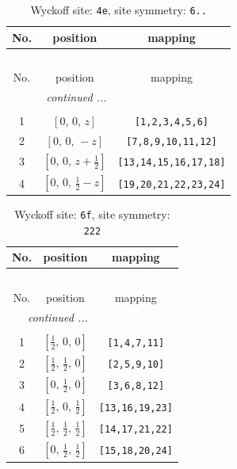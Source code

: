 \documentclass[fleqn,8pt]{jsarticle}
\begin{document}
\renewcommand{\arraystretch}{1.2}
\begin{longtable}{ccc}
\caption{Wyckoff site: {\tt 4e}, site symmetry: {\tt 6..}}
 \\
 \hline \hline
No. & position & mapping \\ \hline \endfirsthead

\multicolumn{2}{l}{\tablename\ \thetable{}} \\
 \hline \hline
No. & position & mapping \\ \hline \endhead

 \hline \hline
\multicolumn{2}{r}{\footnotesize\it continued ...} \\ \endfoot

 \hline \hline
\multicolumn{2}{r}{} \\ \endlastfoot

1 & $\left[ 0,\, 0,\, z \right]$ & {\tt [1,2,3,4,5,6]} \\ \hline
2 & $\left[ 0,\, 0,\, - z \right]$ & {\tt [7,8,9,10,11,12]} \\ \hline
3 & $\left[ 0,\, 0,\, z + \frac{1}{2} \right]$ & {\tt [13,14,15,16,17,18]} \\ \hline
4 & $\left[ 0,\, 0,\, \frac{1}{2} - z \right]$ & {\tt [19,20,21,22,23,24]} \\
\end{longtable}
\renewcommand{\arraystretch}{1.2}
\begin{longtable}{ccc}
\caption{Wyckoff site: {\tt 6f}, site symmetry: {\tt 222}}
 \\
 \hline \hline
No. & position & mapping \\ \hline \endfirsthead

\multicolumn{2}{l}{\tablename\ \thetable{}} \\
 \hline \hline
No. & position & mapping \\ \hline \endhead

 \hline \hline
\multicolumn{2}{r}{\footnotesize\it continued ...} \\ \endfoot

 \hline \hline
\multicolumn{2}{r}{} \\ \endlastfoot

1 & $\left[ \frac{1}{2},\, 0,\, 0 \right]$ & {\tt [1,4,7,11]} \\ \hline
2 & $\left[ \frac{1}{2},\, \frac{1}{2},\, 0 \right]$ & {\tt [2,5,9,10]} \\ \hline
3 & $\left[ 0,\, \frac{1}{2},\, 0 \right]$ & {\tt [3,6,8,12]} \\ \hline
4 & $\left[ \frac{1}{2},\, 0,\, \frac{1}{2} \right]$ & {\tt [13,16,19,23]} \\ \hline
5 & $\left[ \frac{1}{2},\, \frac{1}{2},\, \frac{1}{2} \right]$ & {\tt [14,17,21,22]} \\ \hline
6 & $\left[ 0,\, \frac{1}{2},\, \frac{1}{2} \right]$ & {\tt [15,18,20,24]} \\
\end{longtable}
\end{document}
